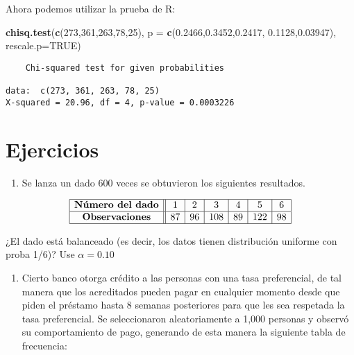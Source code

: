 \documentclass[
  a4paper,
  oneside,
  openany]{book}
\newenvironment{Shaded}{\begin{snugshade}}{\end{snugshade}}
\newcommand{\DataTypeTok}[1]{\textcolor[rgb]{0.13,0.29,0.53}{#1}}
\newcommand{\DecValTok}[1]{\textcolor[rgb]{0.00,0.00,0.81}{#1}}
\newcommand{\FloatTok}[1]{\textcolor[rgb]{0.00,0.00,0.81}{#1}}
\newcommand{\KeywordTok}[1]{\textcolor[rgb]{0.13,0.29,0.53}{\textbf{#1}}}
\newcommand{\NormalTok}[1]{#1}
\newcommand{\OtherTok}[1]{\textcolor[rgb]{0.56,0.35,0.01}{#1}}
\providecommand{\tightlist}{%
  \setlength{\itemsep}{0pt}\setlength{\parskip}{0pt}}
\begin{document}
Ahora podemos utilizar la prueba de R:

\begin{Shaded}
\begin{Highlighting}[]
\KeywordTok{chisq.test}\NormalTok{(}\KeywordTok{c}\NormalTok{(}\DecValTok{273}\NormalTok{,}\DecValTok{361}\NormalTok{,}\DecValTok{263}\NormalTok{,}\DecValTok{78}\NormalTok{,}\DecValTok{25}\NormalTok{), }\DataTypeTok{p =} \KeywordTok{c}\NormalTok{(}\FloatTok{0.2466}\NormalTok{,}\FloatTok{0.3452}\NormalTok{,}\FloatTok{0.2417}\NormalTok{,}
                                       \FloatTok{0.1128}\NormalTok{,}\FloatTok{0.03947}\NormalTok{), }\DataTypeTok{rescale.p=}\OtherTok{TRUE}\NormalTok{)}
\end{Highlighting}
\end{Shaded}

\begin{verbatim}
    Chi-squared test for given probabilities

data:  c(273, 361, 263, 78, 25)
X-squared = 20.96, df = 4, p-value = 0.0003226
\end{verbatim}

\hypertarget{ejercicios-8}{%
\section{Ejercicios}\label{ejercicios-8}}

\begin{enumerate}
\def\labelenumi{\arabic{enumi}.}
\tightlist
\item
  Se lanza un dado 600 veces se obtuvieron los siguientes resultados.
\end{enumerate}

\[
\begin{array}{|c ||c |c |c|c|c|c|}
\hline 
\textbf{Número del dado} & 1& 2& 3&4&5&6 \\
\hline 
\textbf{Observaciones} & 87 &  96 &108&89&122&98 \\
 \hline 
\end{array}
\]

¿El dado está balanceado (es decir, los datos tienen distribución uniforme con proba 1/6)? Use \(\alpha=0.10\)

\begin{enumerate}
\def\labelenumi{\arabic{enumi}.}
\setcounter{enumi}{1}
\tightlist
\item
  Cierto banco otorga crédito a las personas con una tasa preferencial, de tal manera que los acreditados pueden pagar en cualquier momento desde que piden el préstamo hasta 8 semanas posteriores para que les sea respetada la tasa preferencial. Se seleccionaron aleatoriamente a 1,000 personas y observó su comportamiento de pago, generando de esta manera la siguiente tabla de frecuencia:
\end{enumerate}
\end{document}
